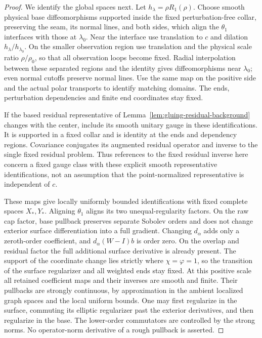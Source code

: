 \documentclass[11pt]{amsart}
\theoremstyle{definition}
\theoremstyle{remark}
\theoremstyle{plain}
\begin{document}
\begin{proof}
We identify the global spaces next. Let $h_\lambda=\rho R_1(\rho)$.
Choose smooth physical base diffeomorphisms supported inside the fixed
perturbation-free collar, preserving the seam, its normal lines, and
both sides, which align the $\theta_1$ interfaces with those at
$\lambda_0$. Near the interface use translation to $c$ and
dilation $h_\lambda/h_{\lambda_0}$. On the smaller observation
region use translation and the physical scale ratio $\rho/\rho_0$,
so that all observation loops become fixed. Radial interpolation between
these separated regions and the identity gives diffeomorphisms near
$\lambda_0$; even normal cutoffs preserve normal lines. Use the
same map on the positive side and the actual polar transports to
identify matching domains. The ends, perturbation dependencies and
finite end coordinates stay fixed.

If the based residual representative of
Lemma~\ref{lem:gluing-residual-background} changes with the center,
include its smooth unitary gauge in these identifications. It is
supported in a fixed collar and is identity at the ends and dependency
regions. Covariance conjugates its augmented residual operator and
inverse to the single fixed residual problem. Thus references to
the fixed residual inverse here concern a fixed gauge class with
these explicit smooth representative identifications, not an assumption
that the point-normalized representative is independent of $c$.

These maps give locally uniformly bounded identifications with fixed
complete spaces $X_*,Y_*$. Aligning $\theta_1$ aligns its two
unequal-regularity factors. On the raw cap factor, base pullback
preserves separate Sobolev orders and does not change exterior surface
differentiation into a full gradient. Changing $d_\alpha$ adds
only a zeroth-order coefficient, and $d_\alpha(W-I)b$ is
order zero. On the overlap and residual factor the full additional
surface derivative is already present. The support of the coordinate
change lies strictly where $\chi=\varphi=1$, so the transition
of the surface regularizer and all weighted ends stay fixed. At
this positive scale all retained coefficient maps and their inverses
are smooth and finite. Their pullbacks are strongly continuous,
by approximation in the ambient localized graph spaces and the local
uniform bounds. One may first regularize in the surface, commuting
its elliptic regularizer past the exterior derivatives, and then
regularize in the base. The lower-order commutators are controlled
by the strong norms. No operator-norm derivative of a rough pullback
is asserted.


\end{proof}
\end{document}
